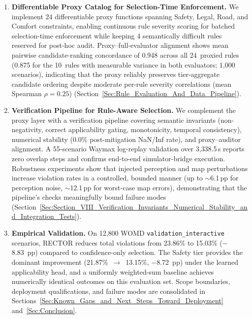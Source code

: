 \begin{enumerate}[label=\textbf{C\arabic*},leftmargin=2.5em]
\item \textbf{Differentiable Proxy Catalog for Selection-Time Enforcement.} We implement 24 differentiable proxy functions spanning Safety, Legal, Road, and Comfort constraints, enabling continuous rule severity scoring for batched selection-time enforcement while keeping 4 semantically difficult rules reserved for post-hoc audit.  Proxy--full-evaluator alignment shows mean pairwise candidate-ranking concordance of 0.948 across all 24~proxied rules (0.875 for the 10~rules with measurable variance in both evaluators; 1{,}000 scenarios), indicating that the proxy reliably preserves tier-aggregate candidate ordering despite moderate per-rule severity correlations (mean Spearman $\rho{=}0.25$) (Section~\ref{Sec:Rule_Evaluation_And_Data_Pipeline}).

\item \textbf{Verification Pipeline for Rule-Aware Selection.} We complement the proxy layer with a verification pipeline covering semantic invariants (non-negativity, correct applicability gating, monotonicity, temporal consistency), numerical stability (0.0\% post-mitigation NaN/Inf rate), and proxy--auditor alignment.  A 55-scenario Waymax log-replay validation over 3{,}338.5\,s reports zero overlap steps and confirms end-to-end simulator-bridge execution.  Robustness experiments show that injected perception and map perturbations increase violation rates in a controlled, bounded manner (up to ${\sim}$6.1\,pp for perception noise, ${\sim}$12.1\,pp for worst-case map errors), demonstrating that the pipeline's checks meaningfully bound failure modes (Section~\ref{Sec:Section_VIII_Verification_Invariants_Numerical_Stability_and_Integration_Tests}).

\item \textbf{Empirical Validation.} On 12{,}800 WOMD \texttt{validation\_interactive} scenarios, \textsc{RECTOR} reduces total violations from 23.86\% to 15.03\% ($-$8.83~pp) compared to confidence-only selection.  The Safety tier provides the dominant improvement (21.87\%~$\to$~13.15\%, $-$8.72~pp) under the learned applicability head, and a uniformly weighted-sum baseline achieves numerically identical outcomes on this evaluation set.  Scope boundaries, deployment qualifications, and failure modes are consolidated in Sections~\ref{Sec:Known_Gaps_and_Next_Steps_Toward_Deployment} and~\ref{Sec:Conclusion}.

\end{enumerate}

